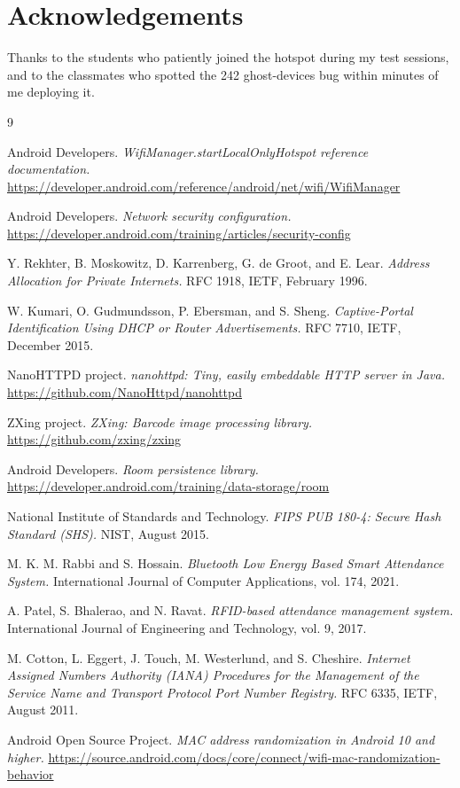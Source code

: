 \documentclass[sigconf,10pt]{acmart}
\begin{document}
\section*{Acknowledgements}
Thanks to the students who patiently joined the hotspot during my
test sessions, and to the classmates who spotted the 242
ghost-devices bug within minutes of me deploying it.

\begin{thebibliography}{9}

Android Developers.
\textit{WifiManager.startLocalOnlyHotspot reference documentation.}
\url{https://developer.android.com/reference/android/net/wifi/WifiManager}

Android Developers.
\textit{Network security configuration.}
\url{https://developer.android.com/training/articles/security-config}

Y. Rekhter, B. Moskowitz, D. Karrenberg, G. de Groot, and E. Lear.
\textit{Address Allocation for Private Internets.}
RFC 1918, IETF, February 1996.

W. Kumari, O. Gudmundsson, P. Ebersman, and S. Sheng.
\textit{Captive-Portal Identification Using DHCP or Router
Advertisements.}
RFC 7710, IETF, December 2015.

NanoHTTPD project.
\textit{nanohttpd: Tiny, easily embeddable HTTP server in Java.}
\url{https://github.com/NanoHttpd/nanohttpd}

ZXing project.
\textit{ZXing: Barcode image processing library.}
\url{https://github.com/zxing/zxing}

Android Developers.
\textit{Room persistence library.}
\url{https://developer.android.com/training/data-storage/room}

National Institute of Standards and Technology.
\textit{FIPS PUB 180-4: Secure Hash Standard (SHS).}
NIST, August 2015.

M. K. M. Rabbi and S. Hossain.
\textit{Bluetooth Low Energy Based Smart Attendance System.}
International Journal of Computer Applications, vol. 174, 2021.

A. Patel, S. Bhalerao, and N. Ravat.
\textit{RFID-based attendance management system.}
International Journal of Engineering and Technology, vol. 9, 2017.

M. Cotton, L. Eggert, J. Touch, M. Westerlund, and S. Cheshire.
\textit{Internet Assigned Numbers Authority (IANA) Procedures for the
Management of the Service Name and Transport Protocol Port Number
Registry.}
RFC 6335, IETF, August 2011.

Android Open Source Project.
\textit{MAC address randomization in Android 10 and higher.}
\url{https://source.android.com/docs/core/connect/wifi-mac-randomization-behavior}

\end{thebibliography}
\end{document}
